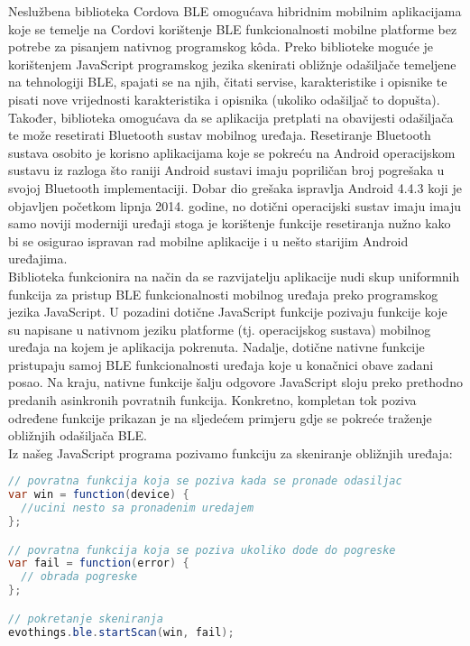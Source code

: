 Neslužbena biblioteka Cordova BLE omogućava hibridnim mobilnim aplikacijama koje se temelje na Cordovi korištenje BLE funkcionalnosti mobilne platforme bez potrebe za pisanjem nativnog programskog kôda. 
Preko biblioteke moguće je korištenjem JavaScript programskog jezika skenirati obližnje odašiljače temeljene na tehnologiji BLE, spajati se na njih, čitati servise, karakteristike i opisnike te pisati nove vrijednosti karakteristika i opisnika (ukoliko odašiljač to dopušta). 
Također, biblioteka omogućava da se aplikacija pretplati na obavijesti odašiljača te može resetirati Bluetooth sustav mobilnog uređaja. 
Resetiranje Bluetooth sustava osobito je korisno aplikacijama koje se pokreću na Android operacijskom sustavu iz razloga što raniji Android sustavi imaju popriličan broj pogrešaka u svojoj Bluetooth implementaciji. 
Dobar dio grešaka ispravlja Android 4.4.3 koji je objavljen početkom lipnja 2014. godine, no dotični operacijski sustav imaju imaju samo noviji moderniji uređaji stoga je korištenje funkcije resetiranja nužno kako bi se osigurao ispravan rad mobilne aplikacije i u nešto starijim Android uređajima.
\\

Biblioteka funkcionira na način da se razvijatelju aplikacije nudi skup uniformnih funkcija za pristup BLE funkcionalnosti mobilnog uređaja preko programskog jezika JavaScript. 
U pozadini dotične JavaScript funkcije pozivaju funkcije koje su napisane u nativnom jeziku platforme (tj. operacijskog sustava) mobilnog uređaja na kojem je aplikacija pokrenuta. 
Nadalje, dotične nativne funkcije pristupaju samoj BLE funkcionalnosti uređaja koje u konačnici obave zadani posao. 
Na kraju, nativne funkcije šalju odgovore JavaScript sloju preko prethodno predanih asinkronih povratnih  funkcija.
Konkretno, kompletan tok poziva određene funkcije prikazan je na sljedećem primjeru gdje se pokreće traženje obližnjih odašiljača BLE.
\\

Iz našeg JavaScript programa pozivamo funkciju za skeniranje obližnjih uređaja:
\begin{lstlisting}[language=java, morekeywords={var,function}]
// povratna funkcija koja se poziva kada se pronade odasiljac
var win = function(device) {
  //ucini nesto sa pronadenim uredajem
};

// povratna funkcija koja se poziva ukoliko dode do pogreske
var fail = function(error) {
  // obrada pogreske
};

// pokretanje skeniranja
evothings.ble.startScan(win, fail);
\end{lstlisting}


